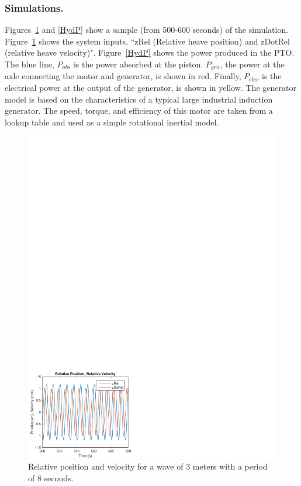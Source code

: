 \documentclass[twocolumn,10pt]{asme2e}
\begin{document}
\subsubsection*{Simulations.}

Figures~\ref{HydZdot} and \ref{HydP} show a sample (from 500-600 seconds) of the simulation. Figure~\ref{HydZdot} shows the system inputs, ``zRel (Relative heave position) and zDotRel (relative heave velocity)". Figure~\ref{HydP} shows the power produced in the PTO. The blue line, $P_{abs}$ is the power absorbed at the piston. $P_{gen}$, the power at the axle connecting the motor and generator, is shown in red. Finally, $P_{elec}$ is the electrical power at the output of the generator, is shown in yellow. The generator model is based on the characteristics of a typical large industrial induction generator. The speed, torque, and efficiency of this motor are taken from a lookup table and used as a simple rotational inertial model. 


\begin{figure}[t]
    \centering
    \includegraphics[width=1\columnwidth]{Images/zRelzDotRel} %
    \caption{Relative position and velocity for a wave of 3 meters with a period of 8 seconds.}
    \label{HydZdot}
    \end{figure}
\end{document}
